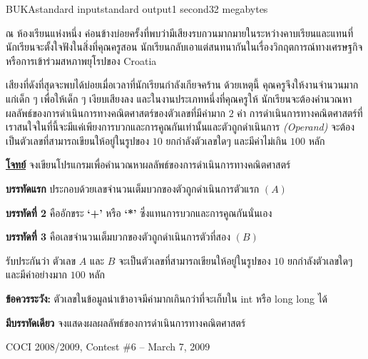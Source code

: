 \documentclass[11pt,a4paper]{article}
\begin{document}
\begin{problem}{BUKA}{standard input}{standard output}{1 second}{32 megabytes}

ณ ห้องเรียนแห่งหนึ่ง ค่อนข้างบ่อยครั้งที่พบว่ามีเสียงรบกวนมากมายในระหว่างคาบเรียนและแทนที่นักเรียนจะตั้งใจฟังในสิ่งที่คุณครูสอน นักเรียนกลับเอาแต่สนทนากันในเรื่องวิกฤตการณ์ทางเศรษฐกิจ หรือการเข้าร่วมสหภาพยุโรปของ Croatia

เสียงที่ดังที่สุดจะพบได้บ่อยเมื่อเวลาที่นักเรียนกำลังเกียจคร้าน ด้วยเหตุนี้ คุณครูจึงให้งานจำนวนมากแก่เด็ก ๆ เพื่อให้เด็ก ๆ เงียบเสียงลง และในงานประเภทหนึ่งที่คุณครูให้ นักเรียนจะต้องคำนวณหาผลลัพธ์ของการดำเนินการทางคณิตศาสตร์ของตัวเลขที่มีค่ามาก $2$ ค่า
การดำเนินการทางคณิตศาสตร์ที่เราสนใจในที่นี้จะมีแค่เพียงการบวกและการคูณกันเท่านั้นและตัวถูกดำเนินการ \textit{(Operand)} จะต้องเป็นตัวเลขที่สามารถเขียนให้อยู่ในรูปของ $10$ ยกกำลังตัวเลขใดๆ และมีค่าไม่เกิน $100$ หลัก

\underline{\textbf{โจทย์}} จงเขียนโปรแกรมเพื่อคำนวณหาผลลัพธ์ของการดำเนินการทางคณิตศาสตร์

\InputFile

\textbf{บรรทัดแรก} ประกอบด้วยเลขจำนวนเต็มบวกของตัวถูกดำเนินการตัวแรก $(A)$

\textbf{บรรทัดที่ 2} คืออักขระ \textbf{‘+’} หรือ \textbf{‘*’} ซึ่งแทนการบวกและการคูณกันนั่นเอง

\textbf{บรรทัดที่ 3} คือเลขจำนวนเต็มบวกของตัวถูกดำเนินการตัวที่สอง $(B)$

รับประกันว่า ตัวเลข $A$ และ $B$ จะเป็นตัวเลขที่สามารถเขียนให้อยู่ในรูปของ $10$ ยกกำลังตัวเลขใดๆ และมีค่าอย่างมาก $100$ หลัก


\textbf{ข้อควรระวัง:} ตัวเลขในข้อมูลนำเข้าอาจมีค่ามากเกินกว่าที่จะเก็บใน int หรือ long long ได้

\OutputFile

\textbf{มีบรรทัดเดียว} จงแสดงผลผลลัพธ์ของการดำเนินการทางคณิตศาสตร์

\Examples

\begin{example}
%
%
%
\end{example}

\Source

COCI 2008/2009, Contest \#6 – March 7, 2009

\end{problem}
\end{document}
